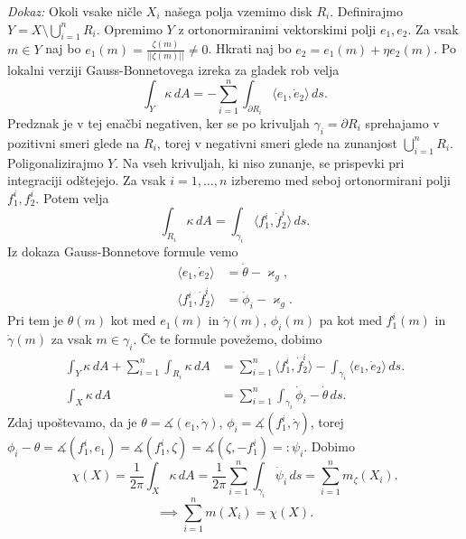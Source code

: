 \noindent
{\em Dokaz:\/}
Okoli vsake ničle $X_i$ našega polja vzemimo disk $R_i$. Definirajmo $Y = X \setminus \bigcup_{i = 1}^{n} R_i$. Opremimo $Y$ z ortonormiranimi vektorskimi polji $e_1, e_2$. Za vsak $m \in Y$ naj bo $e_1(m) = \frac{\zeta(m)}{\lvert\lvert \zeta(m) \rvert\rvert } \neq 0$. Hkrati naj bo
$e_2 = e_1(m) + \eta e_2(m)$. Po lokalni verziji Gauss-Bonnetovega izreka za gladek rob velja \begin{equation*}
\int_{Y} \kappa  \, dA = -\sum_{i = 1}^{n} \int_{\partial R_i} \langle e_1, \dot{e}_2 \rangle   \, ds.  
\end{equation*}
Predznak je v tej enačbi negativen, ker se po krivuljah $\gamma_i = \partial R_i$ sprehajamo v pozitivni smeri glede na $R_i$, torej v negativni smeri glede na zunanjost $\bigcup_{i = 1}^{n} R_i$.    
Poligonalizirajmo $Y$. Na vseh krivuljah, ki niso zunanje, se prispevki pri integraciji odštejejo. Za vsak $i = 1 ,\ldots, n$ izberemo med seboj ortonormirani polji $f_1^{i}, f_2^{i}$. Potem velja \begin{equation*}
\int_{R_i} \kappa   \, dA = \int_{\gamma_i} \langle f_1^{i}, \dot{f}_2^{i} \rangle   \, ds.  
\end{equation*}  
Iz dokaza Gauss-Bonnetove formule vemo \begin{align*}
    \langle e_1, \dot{e}_2  \rangle  &= \dot{\theta} - \varkappa_g, \\
    \langle f_1^{i}, \dot{f}_2^{i}  \rangle  &= \dot{\phi}_i - \varkappa_g. 
\end{align*}
Pri tem je $\theta(m)$ kot med $e_1(m)$ in $\dot{\gamma}(m)$, $\phi_i(m)$ pa kot med $f_1^{i}(m)$ in $\dot{\gamma}(m)$ za vsak $m \in  \gamma_i$. Če te formule povežemo, dobimo \begin{align*}
    \int_{Y} \kappa  \, dA  + \sum_{i = 1}^{n} \int_{R_i} \kappa \, dA  &= \sum_{i = 1}^{n}  \langle f_1^{i}, \dot{f}_2^{i} \rangle - \int_{\gamma_i} \langle e_1, \dot{e}_2 \rangle    \, ds.    \\
    \int_{X} \kappa  \, dA  &= \sum_{i = 1}^{n} \int_{\gamma_i}  \dot{\phi}_i  - \dot{\theta} \, ds.  
\end{align*}
Zdaj upoštevamo, da je $\theta = \measuredangle{(e_1, \dot{\gamma})}$, $\phi_i = \measuredangle{(f_1^{i}, \dot{\gamma})}$, torej $\phi_i - \theta = \measuredangle{(f_1^{i}, e_1)} = \measuredangle{(f_1^{i}, \zeta)} = \measuredangle{(\zeta, -f_1^i)} =: \psi_i$.
Dobimo \begin{equation*}
  \chi(X) =  \frac{1}{2\pi} \int_{X} \kappa  \, dA = \frac{1}{2\pi}\sum_{i = 1}^{n} \int_{\gamma_i} \dot{\psi}_i  \, ds =  \sum_{i = 1}^{n} m_\zeta(X_i). 
\end{equation*}
\begin{equation*}
\implies \sum_{i = 1}^{n} m(X_i) = \chi(X).
\end{equation*}  
    
